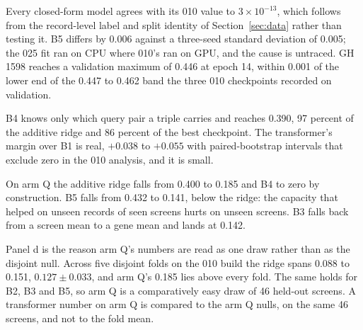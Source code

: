 Every closed-form model agrees with its 010 value to $3 \times 10^{-13}$, which
follows from the record-level label and split identity of Section~\ref{sec:data}
rather than testing it. B5 differs by 0.006 against a three-seed standard deviation
of 0.005; the 025 fit ran on CPU where 010's ran on GPU, and the cause is untraced.
GH 1598 reaches a validation maximum of 0.446 at epoch 14, within 0.001 of the lower
end of the 0.447 to 0.462 band the three 010 checkpoints recorded on validation.

B4 knows only which query pair a triple carries and reaches 0.390, 97 percent of the
additive ridge and 86 percent of the best checkpoint. The transformer's margin over
B1 is real, $+0.038$ to $+0.055$ with paired-bootstrap intervals that exclude zero
in the 010 analysis, and it is small.

On arm Q the additive ridge falls from 0.400 to 0.185 and B4 to zero by
construction. B5 falls from 0.432 to 0.141, below the ridge: the capacity that
helped on unseen records of seen screens hurts on unseen screens. B3 falls back from
a screen mean to a gene mean and lands at 0.142.

Panel d is the reason arm Q's numbers are read as one draw rather than as the
disjoint null. Across five disjoint folds on the 010 build the ridge spans 0.088 to
0.151, $0.127 \pm 0.033$, and arm Q's 0.185 lies above every fold. The same holds
for B2, B3 and B5, so arm Q is a comparatively easy draw of 46 held-out screens. A
transformer number on arm Q is compared to the arm Q nulls, on the same 46 screens,
and not to the fold mean.
